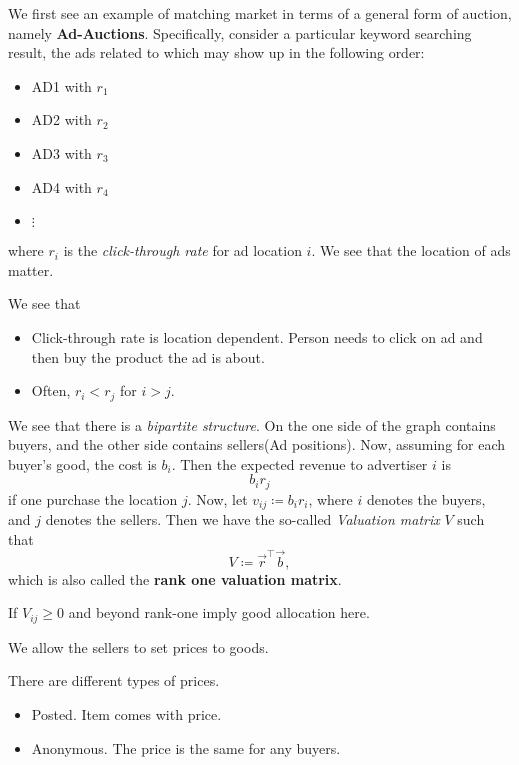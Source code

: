 \begin{eg}
	We first see an example of matching market in terms of a general form of auction, namely \textbf{Ad-Auctions}. Specifically, consider a particular keyword searching result,
	the ads related to which may show up in the following order:
	\begin{itemize}
		\item AD1 with \(r_1\)
		\item AD2 with \(r_2\)
		\item AD3 with \(r_3\)
		\item AD4 with \(r_4\)
		\item \(\vdots\)
	\end{itemize}
	where \(r_i\) is the \emph{click-through rate} for ad location \(i\). We see that the location of ads matter.

	\begin{note}
		We see that
		\begin{itemize}
			\item Click-through rate is location dependent. Person needs to click on ad and then buy the product the ad is about.
			\item Often, \(r_i < r_j\) for \(i > j\).
		\end{itemize}
	\end{note}
\end{eg}

\hr

We see that there is a \emph{bipartite structure}. On the one side of the graph contains buyers, and the other side contains sellers(Ad positions).
Now, assuming for each buyer's good, the cost is \(b_i\). Then the expected revenue to advertiser \(i\) is
\[
	b_i r_j
\] if one purchase the location \(j\). Now, let \(v_{ij} \coloneqq b_{i}r_{i}\), where \(i\) denotes the buyers, and \(j\) denotes the sellers.
Then we have the so-called \emph{Valuation matrix} \(V\) such that
\[
	V \coloneqq  \vec{r}^{\top}\vec{b},
\]
which is also called the \textbf{rank one valuation matrix}.

If \(V_{ij}\geq 0\) and beyond rank-one imply good allocation here.

We allow the sellers to set prices to goods.
\begin{remark}
	There are different types of prices.
	\begin{itemize}
		\item Posted. Item comes with price.
		\item Anonymous. The price is the same for any buyers.
	\end{itemize}
\end{remark}

